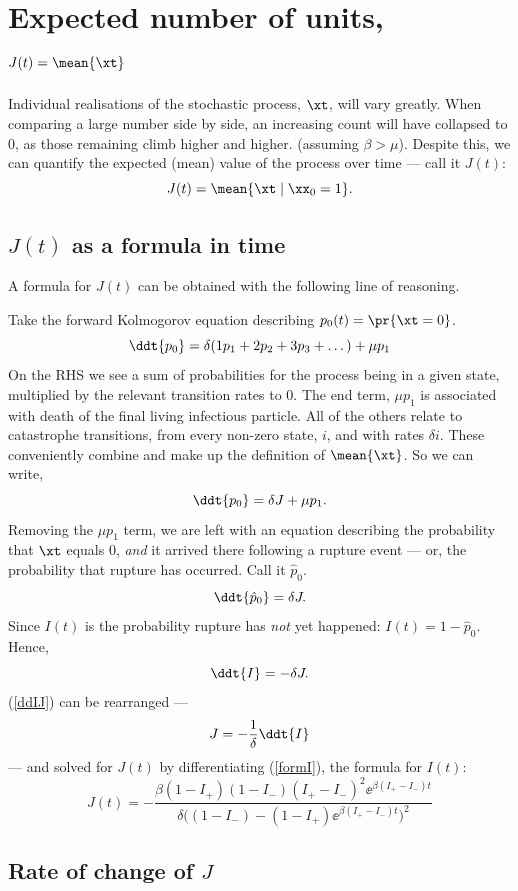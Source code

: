 \section{Expected number of units,  $J(t) = \mean{\xt}$}

Individual realisations of the stochastic process, $\xt$, will vary greatly. When comparing a large number side by side, an increasing count will have collapsed to 0, as those remaining climb higher and higher. (assuming $\beta > \mu$). Despite this, we can quantify the expected (mean) value of the process over time --- call it $J(t)$: 
$$J(t) = \mean{\xt\;|\;\xx_0=1}.$$

\subsection{$J(t)$ as a formula in time}
A formula for $J(t)$ can be obtained with the following line of reasoning. 

Take the forward Kolmogorov equation describing $p_0(t) = \pr{\xt = 0}$.
$$\ddt{p_0} = \delta (1 p_1 + 2 p_2 + 3p_3  + \dots ) + \mu p_1$$
 On the RHS we see a sum of probabilities for the process being in a given state, multiplied by the relevant transition rates to 0. The end term, $\mu p_1$ is associated with death of the final living infectious particle. All of the others relate to catastrophe transitions, from every non-zero state, $i$, and with rates $\delta i$. These conveniently combine and make up the definition of $\mean{\xt}$. So we can write,
$$\ddt{p_0} = \delta J + \mu p_1.$$
Removing the $\mu p_1$ term, we are left with an equation describing the probability that $\xt$  equals $0$, \textit{and} it arrived there following a rupture event --- or, the probability that rupture has occurred. Call it $\hat p_0$. 
$$\ddt{\hat p_0} = \delta J.$$
Since $I(t)$ is the probability rupture has \textit{not} yet happened: $I(t) = 1-\hat p_0$. Hence,
\begin{equation}
\label{ddIJ}
\ddt{I} = -\delta J.
\end{equation}
(\ref{ddIJ}) can be rearranged ---
$$J = -\frac{1}{\delta}\ddt{I}$$
--- and solved for $J(t)$ by differentiating  (\ref{formI}), the formula for $I(t)$:
\begin{equation*}
J(t) = -\frac{\beta(1-I_+)(1-I_-)(I_+-I_-)^2\ee^{\beta(I_+-I_-)t}}{\delta\big((1-I_-) - (1-I_+)\ee^{\beta(I_+-I_-)t}\big)^2}
\end{equation*}



\subsection{Rate of change of $J$}

